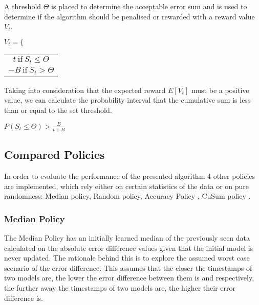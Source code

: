 \documentclass{mpaper}
\begin{document}
A threshold $\Theta$ is placed to determine the acceptable error sum and is used to determine if the algorithm should be penalised or rewarded with a reward value $V_t$.
\begin{center}
    $V_t = \Bigg\{ $ \begin{tabular}{c}
                  $t\ \text{if}\ S_t \leq \Theta$ \\
                  $-B\ \text{if}\ S_t > \Theta$
                  \end{tabular}
\end{center}

Taking into consideration that the expected reward $E[V_t]$ must be a positive value, we can calculate the probability interval that the cumulative sum is less than or equal to the set threshold.
\begin{center}
    $P(S_t \leq \Theta) > \frac{B}{t+B}$
\end{center}

    
    
    

\subsection{Compared Policies}

In order to evaluate the performance of the presented algorithm 4 other policies are implemented, which rely either on certain statistics of the data or on pure randomness:
Median policy, Random policy, Accuracy Policy , CuSum policy \cite{cusum_pierre}.

\subsubsection{Median Policy}

The Median Policy has an initially learned median of the previously seen data calculated on the absolute error difference values given that the initial model is never updated. 
The rationale behind this is to explore the assumed worst case scenario of the error difference. This assumes that the closer the timestamps of two models are, the lower the error difference between them is and respectively, the further away the timestamps of two models are, the higher their error difference is.
\end{document}
